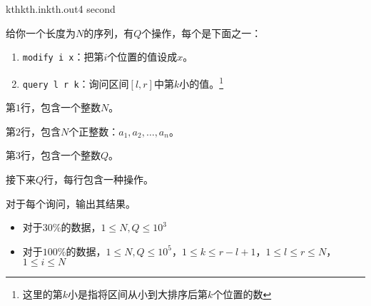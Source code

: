 \documentclass[11pt,a4paper,oneside]{article}
\begin{document}
\begin{problem}{kth}{kth.in}{kth.out}{4 second} 
	
	给你一个长度为$N$的序列，有$Q$个操作，每个是下面之一：
	
	\begin{enumerate}
		\item \texttt{modify i x}：把第$i$个位置的值设成$x$。
		\item \texttt{query l r k}：询问区间$[l,r]$中第$k$小的值。\footnote{这里的第$k$小是指将区间从小到大排序后第$k$个位置的数}
	\end{enumerate}

    \InputFile
	
	第$1$行，包含一个整数$N$。
	
	第$2$行，包含$N$个正整数：$a_1,a_2,\dots,a_n$。
	
	第$3$行，包含一个整数$Q$。
	
	接下来$Q$行，每行包含一种操作。

    \OutputFile
    
    对于每个询问，输出其结果。

    \Example

    \begin{example}
    \end{example}

    \Note
  
    \begin{itemize}
		\item 对于$30\%$的数据，$1 \leq N, Q \leq 10^3$
		\item 对于$100\%$的数据，$1 \leq N, Q \leq 10^5$，$1 \leq k \leq r - l + 1$，$1 \leq l \leq r \leq N$，$1 \leq i \leq N$
    \end{itemize}

\end{problem}
\end{document}
